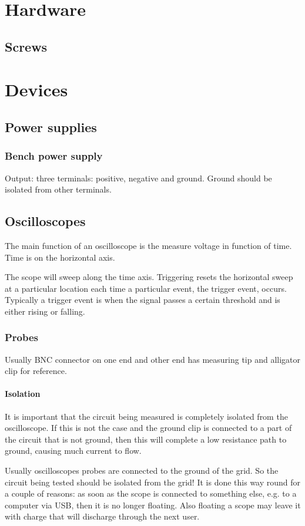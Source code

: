 \chapter{Hardware}
\section{Screws}
\chapter{Devices}
\section{Power supplies}
\subsection{Bench power supply}
Output: three terminals: positive, negative and ground. Ground should be isolated from other terminals.
\section{Oscilloscopes}
The main function of an oscilloscope is the measure voltage in function of time. Time is on the horizontal axis.

The scope will sweep along the time axis. Triggering resets the horizontal sweep at a particular location each time a particular event, the trigger event, occurs.
Typically a trigger event is when the signal passes a certain threshold and is either rising or falling.
\subsection{Probes}
Usually BNC connector on one end and other end has measuring tip and alligator clip for reference.
\subsubsection{Isolation}
It is important that the circuit being measured is completely isolated from the oscilloscope. If this is not the case and the ground clip is connected to a part of the circuit that is not ground, then this will complete a low resistance path to ground, causing much current to flow.

Usually oscilloscopes probes are connected to the ground of the grid. So the circuit being tested should be isolated from the grid! It is done this way round for a couple of reasons: as soon as the scope is connected to something else, e.g. to a computer via USB, then it is no longer floating. Also floating a scope may leave it with charge that will discharge through the next user.

